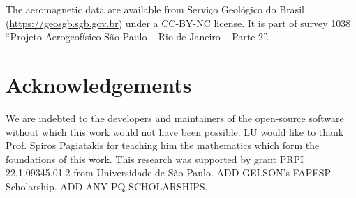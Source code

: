 The aeromagnetic data are available from Serviço Geológico do Brasil
(\url{https://geosgb.sgb.gov.br}) under a CC-BY-NC license. It is part of
survey 1038 ``Projeto Aerogeofísico São Paulo -- Rio de Janeiro -- Parte 2''.



\section*{Acknowledgements}

We are indebted to the developers and maintainers of the open-source software
without which this work would not have been possible.
LU would like to thank Prof. Spiros Pagiatakis for teaching him the mathematics
which form the foundations of this work.
This research was supported by
grant PRPI 22.1.09345.01.2 from Universidade de São Paulo.
ADD GELSON's FAPESP Scholarship.
ADD ANY PQ SCHOLARSHIPS.

